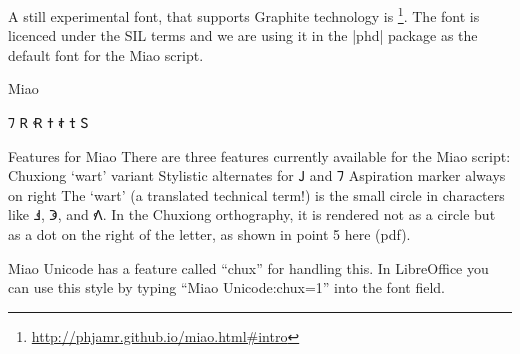 A still experimental font, that supports Graphite technology is \footnote{\url{http://phjamr.github.io/miao.html\#intro}}. The font is licenced under the SIL terms and we are using it in the |phd| package as the default font for the Miao script.



\begin{scriptexample}[]{Miao}
\end{scriptexample}

{\miao 𖼴	𖼵	𖼶	𖼷	𖼸	𖼹	𖼺	}

Features for Miao
There are three features currently available for the Miao script:
\bgroup
\miao
Chuxiong ‘wart’ variant
Stylistic alternates for 𖼳 and 𖼴
Aspiration marker always on right
The ‘wart’ (a translated technical term!) is the small circle in characters like 𖼁, 𖼅, and 𖼾. In the Chuxiong orthography, it is rendered not as a circle but as a dot on the right of the letter, as shown in point 5 here (pdf).

Miao Unicode has a feature called “chux” for handling this. In LibreOffice you can use this style by typing “Miao Unicode:chux=1” into the font field.